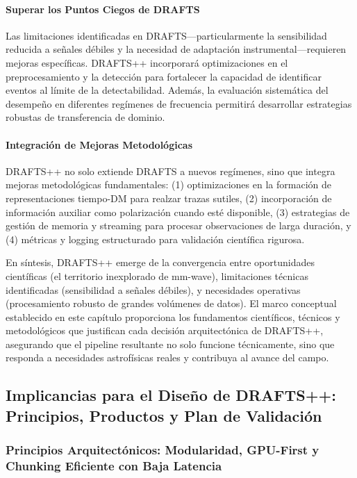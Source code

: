 \paragraph{Superar los Puntos Ciegos de DRAFTS}

Las limitaciones identificadas en DRAFTS—particularmente la sensibilidad reducida a señales débiles y la necesidad de adaptación instrumental—requieren mejoras específicas. DRAFTS++ incorporará optimizaciones en el preprocesamiento y la detección para fortalecer la capacidad de identificar eventos al límite de la detectabilidad. Además, la evaluación sistemática del desempeño en diferentes regímenes de frecuencia permitirá desarrollar estrategias robustas de transferencia de dominio.

\paragraph{Integración de Mejoras Metodológicas}

DRAFTS++ no solo extiende DRAFTS a nuevos regímenes, sino que integra mejoras metodológicas fundamentales: (1) optimizaciones en la formación de representaciones tiempo-DM para realzar trazas sutiles, (2) incorporación de información auxiliar como polarización cuando esté disponible, (3) estrategias de gestión de memoria y streaming para procesar observaciones de larga duración, y (4) métricas y logging estructurado para validación científica rigurosa.

En síntesis, DRAFTS++ emerge de la convergencia entre oportunidades científicas (el territorio inexplorado de mm-wave), limitaciones técnicas identificadas (sensibilidad a señales débiles), y necesidades operativas (procesamiento robusto de grandes volúmenes de datos). El marco conceptual establecido en este capítulo proporciona los fundamentos científicos, técnicos y metodológicos que justifican cada decisión arquitectónica de DRAFTS++, asegurando que el pipeline resultante no solo funcione técnicamente, sino que responda a necesidades astrofísicas reales y contribuya al avance del campo.

\subsection{Implicancias para el Diseño de DRAFTS++: Principios, Productos y Plan de Validación}

\subsubsection{Principios Arquitectónicos: Modularidad, GPU-First y Chunking Eficiente con Baja Latencia}

